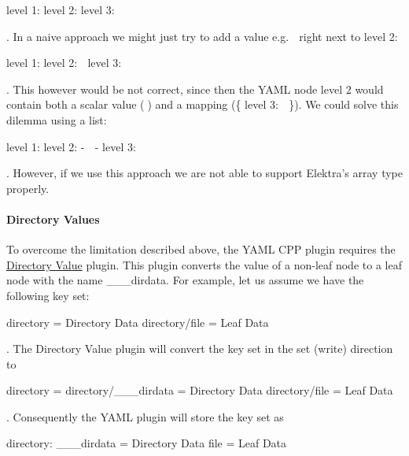 \begin{DoxyCode}
level 1:
  level 2:
    level 3: 🍁
\end{DoxyCode}


. In a naive approach we might just try to add a value e.\+g. {\ttfamily 🙈} right next to level 2\+:


\begin{DoxyCode}
level 1:
  level 2: 🙈
    level 3:  🍁
\end{DoxyCode}


. This however would be not correct, since then the Y\+A\+ML node {\ttfamily level 2} would contain both a scalar value ({\ttfamily 🙈}) and a mapping ({\ttfamily \{ level 3\+: 🍁 \}}). We could solve this dilemma using a list\+:


\begin{DoxyCode}
level 1:
  level 2:
    - 🙈
    - level 3: 🍁
\end{DoxyCode}


. However, if we use this approach we are not able to support Elektra’s array type properly.

\paragraph*{Directory Values}

To overcome the limitation described above, the Y\+A\+ML C\+PP plugin requires the \hyperlink{md_src_plugins_directoryvalue_README_src_plugins_directoryvalue_README_md}{Directory Value} plugin. This plugin converts the value of a non-\/leaf node to a leaf node with the name {\ttfamily \+\_\+\+\_\+\+\_\+dirdata}. For example, let us assume we have the following key set\+:


\begin{DoxyCode}
directory      = Directory Data
directory/file = Leaf Data
\end{DoxyCode}


. The Directory Value plugin will convert the key set in the set (write) direction to


\begin{DoxyCode}
directory            =
directory/\_\_\_dirdata = Directory Data
directory/file       = Leaf Data
\end{DoxyCode}


. Consequently the Y\+A\+ML plugin will store the key set as


\begin{DoxyCode}
directory: \_\_\_dirdata = Directory Data
  file       = Leaf Data
\end{DoxyCode}


